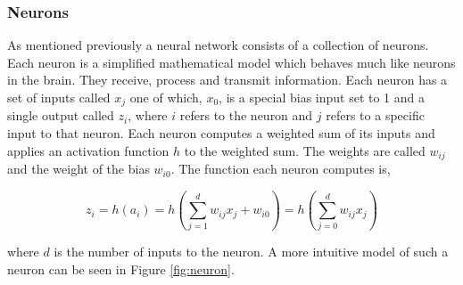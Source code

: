 \subsubsection{Neurons}\label{sec:neurons}

As mentioned previously a neural network consists of a collection of neurons.
Each neuron is a simplified mathematical model which behaves much like neurons
in the brain. They receive, process and transmit information. Each neuron has a
set of inputs called $x_{j}$ one of which, $x_{0}$, is a special bias input set
to 1 and a single output called $z_i$, where $i$ refers to the neuron and $j$
refers to a specific input to that neuron. Each neuron computes a weighted sum
of its inputs and applies an activation function $h$ to the weighted sum. The
weights are called $w_{ij}$ and the weight of the bias $w_{i0}$. The function
each neuron computes is,

\begin{equation}\label{eq:neuron}
    z_i = h(a_i) = h\left(
        \sum_{j = 1}^d w_{ij}x_j + w_{i0}
 \right) = h\left(
        \sum_{j = 0}^d w_{ij}x_j \right)
\end{equation}

where $d$ is the number of inputs to the neuron. A more intuitive model of such
a neuron can be seen in Figure \ref{fig:neuron}.

